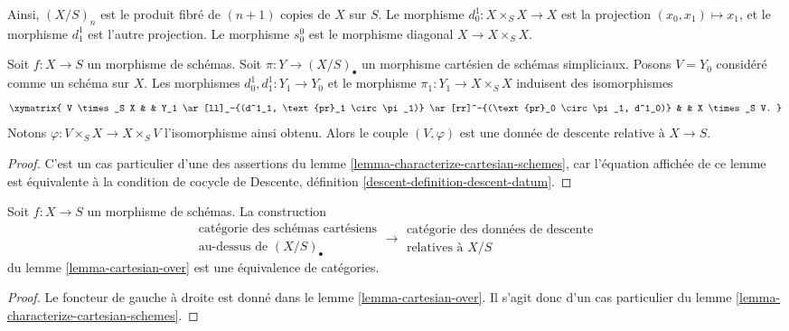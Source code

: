 \noindent
Ainsi, $(X/S)_n$ est le produit fibré de $(n + 1)$ copies de $X$ sur $S$.
Le morphisme $d^1_0 : X \times_S X \to X$ est la projection
$(x_0, x_1) \mapsto x_1$, et le morphisme $d^1_1$ est l'autre
projection. Le morphisme $s^0_0$ est le morphisme diagonal
$X \to X \times_S X$.

\begin{lemma}
\label{lemma-cartesian-over}
Soit $f : X \to S$ un morphisme de schémas.
Soit $\pi : Y \to (X/S)_\bullet$ un morphisme cartésien
de schémas simpliciaux.
Posons $V = Y_0$ considéré comme un schéma sur $X$.
Les morphismes $d^1_0, d^1_1 : Y_1 \to Y_0$ et le morphisme
$\pi_1 : Y_1 \to X \times_S X$ induisent des isomorphismes
$$
\xymatrix{
V \times_S X & &
Y_1 \ar[ll]_-{(d^1_1, \text{pr}_1 \circ \pi_1)}
\ar[rr]^-{(\text{pr}_0 \circ \pi_1, d^1_0)} & &
X \times_S V.
}
$$
Notons $\varphi : V \times_S X \to X \times_S V$
l'isomorphisme ainsi obtenu.
Alors le couple $(V, \varphi)$ est une donnée de descente relative
à $X \to S$.
\end{lemma}

\begin{proof}
C'est un cas particulier d'une des assertions du
lemme \ref{lemma-characterize-cartesian-schemes},
car l'équation affichée de ce lemme est
équivalente à la condition de cocycle de
Descente, définition \ref{descent-definition-descent-datum}.
\end{proof}

\begin{lemma}
\label{lemma-cartesian-equivalent-descent-datum}
Soit $f : X \to S$ un morphisme de schémas. La construction
$$
\begin{matrix}
\text{catégorie des schémas cartésiens} \\
\text{au-dessus de } (X/S)_\bullet
\end{matrix}
\longrightarrow
\begin{matrix}
\text{catégorie des données de descente} \\
\text{relatives à } X/S
\end{matrix}
$$
du lemme \ref{lemma-cartesian-over}
est une équivalence de catégories.
\end{lemma}

\begin{proof}
Le foncteur de gauche à droite est donné dans le lemme
\ref{lemma-cartesian-over}.
Il s’agit donc d’un cas particulier du lemme
\ref{lemma-characterize-cartesian-schemes}.
\end{proof}

